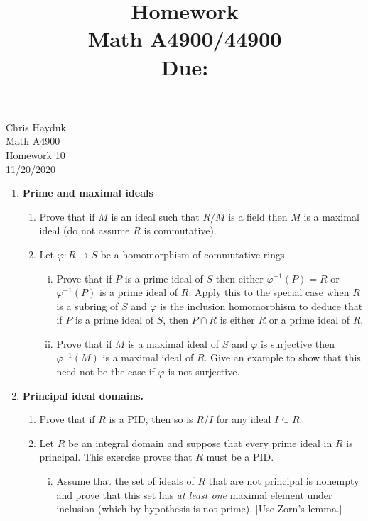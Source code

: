 \documentclass[11pt, reqno]{amsart}
\title[Homework \HW]{Homework \HW \\
Math A4900/44900\\
\small Due: \DUE}
\author{}
\theoremstyle{plain}
\theoremstyle{definition}
\theoremstyle{example}
\def\HW{10}
\def\DUE{11/20/2020}
\begin{document}
\begin{flushright}
Chris Hayduk\\
Math A4900\\
Homework \HW\\
\DUE
\end{flushright}





\begin{enumerate}[1.]
\item \textbf{Prime and maximal ideals}
\begin{enumerate}
\item Prove that if $M$ is an ideal such that $R/M$ is a field then $M$ is a maximal ideal (do not assume $R$ is commutative). 


\item Let $\varphi: R \to S$ be a homomorphism of commutative rings. 
\begin{enumerate}[(i)]
\item Prove that if $P$ is a prime ideal of $S$ then either $\varphi^{-1}(P) = R$ or $\varphi^{-1}(P)$ is a prime ideal of $R$. Apply this to the special case when $R$ is a subring of $S$ and $\varphi$ is the inclusion homomorphism to deduce that if $P$ is a prime ideal of $S$, then $P \cap R$ is either $R$ or a prime ideal of $R$. 
\item Prove that if $M$ is a maximal ideal of $S$ and $\varphi$ is surjective then $\varphi^{-1}(M)$ is a maximal ideal of $R$. Give an example to show that this need not be the case if $\varphi$ is not surjective. 
\end{enumerate}


\end{enumerate}

\item \textbf{Principal ideal domains.}
\begin{enumerate}
\item Prove that if $R$ is a PID, then so is $R/I$ for any ideal $I \subseteq R$. 
\item Let $R$ be an integral domain and suppose that every prime ideal in $R$ is principal. This exercise proves that $R$ must be a PID.
\begin{enumerate}[(i)]
\item Assume that the set of ideals of $R$ that are not principal is nonempty and prove that this set has \emph{at least one} maximal element under inclusion (which by hypothesis is not prime). {[Use Zorn's lemma.]}


\end{enumerate}
\end{enumerate}
\end{enumerate}
\end{document}
